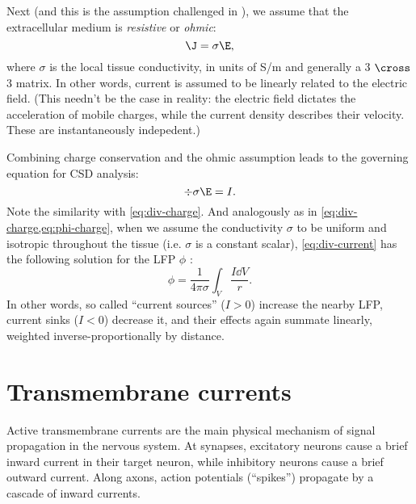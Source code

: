 Next (and this is the assumption challenged in \cite{Bedard2011}), we assume that the extracellular medium is \emph{resistive} or \emph{ohmic}:
%
\begin{equation}
\label{eq:ohmic-medium}
\J = \sigma \E,
\end{equation}
%
where $\sigma$ is the local tissue conductivity, in units of S/m and generally a 3 $\cross$ 3 matrix. In other words, current is assumed to be linearly related to the electric field. (This needn't be the case in reality: the electric field dictates the acceleration of mobile charges, while the current density describes their velocity. These are instantaneously indepedent.)

Combining charge conservation and the ohmic assumption leads to the governing equation for CSD analysis:
%
\begin{equation}
\label{eq:div-current}
\div{\sigma \E} = I.
\end{equation}
%
Note the similarity with \cref{eq:div-charge}. And analogously as in \cref{eq:div-charge,eq:phi-charge}, when we assume the conductivity $\sigma$ to be uniform and isotropic throughout the tissue (i.e. $\sigma$ is a constant scalar)\footnotemark{}, \cref{eq:div-current} has the following solution for the LFP $\phi$ \cite{Plonsey2007}:
%
\begin{equation}
\label{eq:phi-current}
\phi = \frac{1}{4 \pi \sigma} \int_V \frac{I \dd{V}}{r}.
\end{equation}
%
In other words, so called ``current sources'' ($I > 0$) increase the nearby LFP, current sinks ($I < 0$) decrease it, and their effects again summate linearly, weighted inverse-proportionally by distance.




\section{Transmembrane currents}
\label{sec:transmembrane-currents}

Active transmembrane currents are the main physical mechanism of signal propagation in the nervous system.\footnotemark{} At synapses, excitatory neurons cause a brief inward current in their target neuron, while inhibitory neurons cause a brief outward current. Along axons, action potentials (``spikes'') propagate by a cascade of inward currents.

